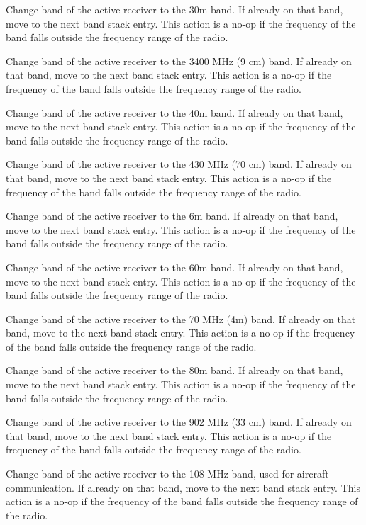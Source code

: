 \documentclass[12pt]{book}
\begin{document}
{Change band of the active receiver to the 30m band. If already on that band, move to
the next band stack entry. This action is a no-op if the frequency of the band falls outside the frequency
range of the radio.}

{Change band of the active receiver to the 3400 MHz (9 cm) band. If already on that band, move to
the next band stack entry. This action is a no-op if the frequency of the band falls outside the frequency
range of the radio.}

{Change band of the active receiver to the 40m band. If already on that band, move to
the next band stack entry. This action is a no-op if the frequency of the band falls outside the frequency
range of the radio.}

{Change band of the active receiver to the 430 MHz (70 cm) band. If already on that band, move to
the next band stack entry. This action is a no-op if the frequency of the band falls outside the frequency
range of the radio.}

{Change band of the active receiver to the 6m band. If already on that band, move to
the next band stack entry. This action is a no-op if the frequency of the band falls outside the frequency
range of the radio.}

{Change band of the active receiver to the 60m band. If already on that band, move to
the next band stack entry. This action is a no-op if the frequency of the band falls outside the frequency
range of the radio.}

{Change band of the active receiver to the 70 MHz (4m)  band. If already on that band, move to
the next band stack entry. This action is a no-op if the frequency of the band falls outside the frequency
range of the radio.}

{Change band of the active receiver to the 80m band. If already on that band, move to
the next band stack entry. This action is a no-op if the frequency of the band falls outside the frequency
range of the radio.}

{Change band of the active receiver to the 902 MHz (33 cm) band. If already on that band, move to
the next band stack entry. This action is a no-op if the frequency of the band falls outside the frequency
range of the radio.}

{Change band of the active receiver to the 108 MHz band, used for aircraft communication. If already on that
band, move to
the next band stack entry. This action is a no-op if the frequency of the band falls outside the frequency
range of the radio.}
\end{document}
